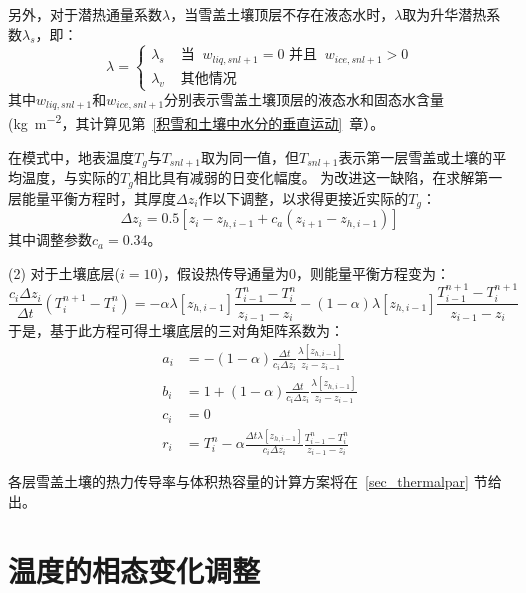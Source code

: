 另外，对于潜热通量系数$\lambda$，当雪盖土壤顶层不存在液态水时，$\lambda$取为升华潜热系数$\lambda_s$，即：
\begin{equation}
\lambda=\left\{\begin{array}{lr}\lambda_{s} & \text { 当 }\ w_{liq, s n l+1}=0 \text { 并且 }\ w_{ice, s n l+1}>0 \\ \lambda_{v} & \text { 其他情况 }\end{array}\right.
\end{equation}
其中$w_{liq,snl+1}$和$w_{ice,snl+1}$分别表示雪盖土壤顶层的液态水和固态水含量 (\unit{kg.m^{-2}}，其计算见第~\ref{积雪和土壤中水分的垂直运动}~章）。

在模式中，地表温度$T_g$与$T_{snl+1}$取为同一值，但$T_{snl+1}$表示第一层雪盖或土壤的平均温度，与实际的$T_g$相比具有减弱的日变化幅度。
为改进这一缺陷，在求解第一层能量平衡方程时，其厚度$\Delta z_i$作以下调整，以求得更接近实际的$T_g$：
\begin{equation}
\Delta z_{i}=0.5\left[z_{i}-z_{h, i-1}+c_{a}\left(z_{i+1}-z_{h, i-1}\right)\right]
\end{equation}
其中调整参数$c_a=0.34$。

(2) 对于土壤底层($i=10$)，假设热传导通量为0，则能量平衡方程变为：
\begin{equation}
\frac{c_{i} \Delta z_{i}}{\Delta t}\left(T_{i}^{n+1}-T_{i}^{n}\right)=-\alpha \lambda\left[z_{h, i-1}\right] \frac{T_{i-1}^{n}-T_{i}^{n}}{z_{i-1}-z_{i}}-(1-\alpha) \lambda\left[z_{h, i-1}\right] \frac{T_{i-1}^{n+1}-T_{i}^{n+1}}{z_{i-1}-z_{i}}
\end{equation}
于是，基于此方程可得土壤底层的三对角矩阵系数为：
\begin{equation}
\begin{aligned}
a_{i} &= -(1-\alpha) \frac{\Delta t}{c_{i} \Delta z_{i}} \frac{\lambda\left[z_{h, i-1}\right]}{z_{i}-z_{i-1}} \\
b_{i} &= 1+(1-\alpha) \frac{\Delta t}{c_{i} \Delta z_{i}} \frac{\lambda\left[z_{h, i-1}\right]}{z_{i}-z_{i-1}} \\
c_{i} &= 0 \\
r_{i} &= T_{i}^{n}-\alpha \frac{\Delta t \lambda\left[z_{h, i-1}\right]}{c_{i} \Delta z_{i}} \frac{T_{i-1}^{n}-T_{i}^{n}}{z_{i-1}-z_{i}}
\end{aligned}
\end{equation}

各层雪盖土壤的热力传导率与体积热容量的计算方案将在~\ref{sec_thermalpar} 节给出。


\section{温度的相态变化调整}

